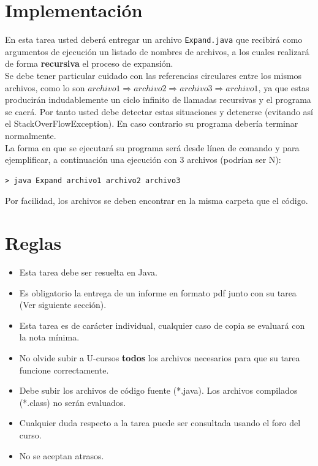 \documentclass[dcc]{fcfmcourse}
\begin{document}
\newpage
\section{Implementación}
En esta tarea usted deberá entregar un archivo \texttt{Expand.java} que recibirá como argumentos de ejecución un listado de nombres de archivos, a los cuales realizará de forma \textbf{recursiva} el proceso de expansión. \\

Se debe tener particular cuidado con las referencias circulares entre los mismos archivos, como lo son $archivo1\Rightarrow archivo2 \Rightarrow archivo3 \Rightarrow archivo1$, ya que estas producirán indudablemente un ciclo infinito de llamadas recursivas y el programa se caerá. Por tanto usted debe detectar estas situaciones y detenerse (evitando así el StackOverFlowException). En caso contrario su programa debería terminar normalmente. \\

La forma en que se ejecutará su programa será desde línea de comando y para ejemplificar, a continuación una ejecución con 3 archivos (podrían ser N):

\begin{lstlisting}[frame=single]
> java Expand archivo1 archivo2 archivo3
\end{lstlisting}

Por facilidad, los archivos se deben encontrar en la misma carpeta que el código. \\


\newpage
\section{Reglas}

\begin{itemize}
    \item Esta tarea debe ser resuelta en Java.
    \item Es obligatorio la entrega de un informe en formato pdf junto con su tarea (Ver siguiente sección).
    \item Esta tarea es de carácter individual, cualquier caso de copia se evaluará con la nota mínima.
    \item No olvide subir a U-cursos \textbf{todos} los archivos necesarios para que su tarea funcione correctamente.
    \item Debe subir los archivos de código fuente (*.java). Los archivos compilados (*.class) no serán evaluados.
    \item Cualquier duda respecto a la tarea puede ser consultada usando el foro del curso.
    \item No se aceptan atrasos.
\end{itemize}
\end{document}
